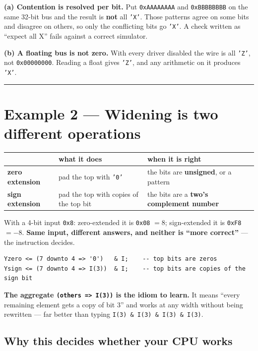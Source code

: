 \documentclass[11pt]{article}
\newcommand{\code}[1]{\texttt{#1}}
\newcommand{\hr}{\vspace{2pt}\hrule\vspace{6pt}}
\begin{document}
\textbf{(a) Contention is resolved per bit.} Put \code{0xAAAAAAAA} and
\code{0xBBBBBBBB} on the same 32-bit bus and the result is \textbf{not} all
\code{'X'}. Those patterns agree on some bits and disagree on others, so only the
conflicting bits go \code{'X'}. A check written as ``expect all X'' fails against
a correct simulator.

\textbf{(b) A floating bus is not zero.} With every driver disabled the wire is
all \code{'Z'}, not \code{0x00000000}. Reading a float gives \code{'Z'}, and any
arithmetic on it produces \code{'X'}.

\vspace{4pt}\hr

\section*{Example 2 --- Widening is two different operations}

\begin{center}
\small
\begin{tabular}{l>{\raggedright\arraybackslash}p{5.6cm}>{\raggedright\arraybackslash}p{5.6cm}}
\toprule
& what it does & when it is right \\
\midrule
\textbf{zero extension} & pad the top with \code{'0'} & the bits are \textbf{unsigned}, or a pattern \\
\textbf{sign extension} & pad the top with copies of the top bit & the bits are a \textbf{two's complement number} \\
\bottomrule
\end{tabular}
\end{center}

With a 4-bit input \code{0x8}: zero-extended it is \code{0x08} $= 8$;
sign-extended it is \code{0xF8} $= -8$. \textbf{Same input, different answers, and
neither is ``more correct''} --- the instruction decides.

\begin{lstlisting}
Yzero <= (7 downto 4 => '0')   & I;    -- top bits are zeros
Ysign <= (7 downto 4 => I(3))  & I;    -- top bits are copies of the sign bit
\end{lstlisting}

\textbf{The aggregate \code{(others => I(3))} is the idiom to learn.} It means
``every remaining element gets a copy of bit 3'' and works at any width without
being rewritten --- far better than typing \code{I(3) \& I(3) \& I(3) \& I(3)}.

\subsection*{Why this decides whether your CPU works}
\end{document}
